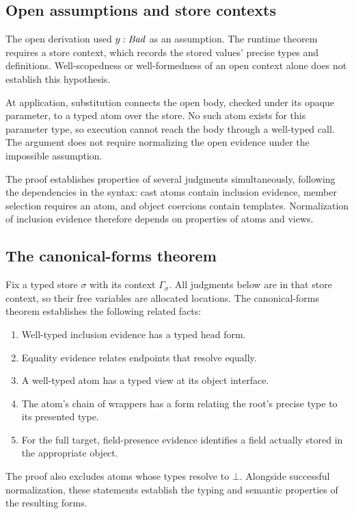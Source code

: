\subsection*{Open assumptions and store contexts}
The open derivation used $y:\mathit{Bad}$ as an assumption.
The runtime theorem requires a store context, which records the stored
values' precise types and definitions. Well-scopedness or well-formedness of
an open context alone does not establish this hypothesis.

At application, substitution connects the open body, checked under its
opaque parameter, to a typed atom over the store. No such atom exists
for this parameter type, so execution cannot reach the body through a
well-typed call. The argument does not require normalizing the open
evidence under the impossible assumption.


\label{sec:proof}

The proof establishes properties of several judgments simultaneously,
following the dependencies in the syntax: cast atoms contain inclusion evidence, member selection
requires an atom, and object coercions contain templates. Normalization
of inclusion evidence therefore depends on properties of atoms and views.

\subsection*{The canonical-forms theorem}
Fix a typed store $\sigma$ with its context $\Gamma_\sigma$.
All judgments below are in that store context, so their free variables
are allocated locations. The canonical-forms theorem establishes the
following related facts:
\begin{enumerate}
\item Well-typed inclusion evidence has a typed head form.
\item Equality evidence relates endpoints that resolve equally.
\item A well-typed atom has a typed view at its object interface.
\item The atom's chain of wrappers has a form relating the root's
precise type to its presented type.
\item For the full target, field-presence evidence identifies a field actually stored in
the appropriate object.
\end{enumerate}
The proof also excludes atoms whose types resolve to $\bot$. Alongside
successful normalization, these statements establish the typing and
semantic properties of the resulting forms.

